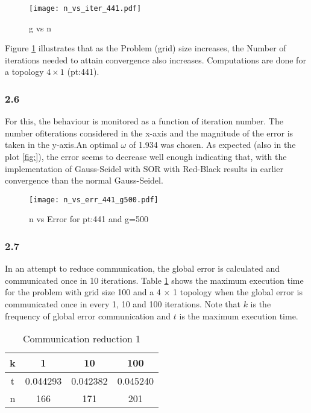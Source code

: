 \begin{figure}[ht]
  \centering
  \texttt{[image: n\_vs\_iter\_441.pdf]}
  \caption{\label{fig:n_vs_iter}  g vs n}
\end{figure}

Figure \ref{fig:n_vs_iter} illustrates that as the Problem (grid) size increases, the Number of iterations needed to attain convergence also increases. Computations are done for a topology $4 \times 1$ (pt:441).


\subsubsection*{2.6}
For this, the behaviour is monitored as a function of iteration number. The number ofiterations considered in the x-axis and the magnitude of the error is taken in the y-axis.An optimal $\omega$ of 1.934 was chosen. As expected (also in the plot \ref{fig:}), the error seems to decrease well enough indicating that, with the implementation of Gauss-Seidel with SOR with Red-Black results in earlier convergence than the normal Gauss-Seidel.
\begin{figure}[h]
  \centering
  \texttt{[image: n\_vs\_err\_441\_g500.pdf]}
  \caption{\label{fig:n_vs_err}  n vs Error for pt:441 and g=500}
\end{figure}
\subsubsection*{2.7}
In an attempt to reduce communication, the global error is calculated and communicated once in 10 iterations. Table \ref{comm1} shows the maximum execution time for the problem with grid size 100 and a 4 $ \times $ 1 topology when the global error is communicated once in every 1, 10 and 100 iterations. Note that $ k $  is the frequency of global error communication and $ t $ is the maximum execution time. \\
	
\begin{table}[h!]
  \centering
  \begin{tabular}{|c|c c c|}
    \hline
    k & 1 		 	& 10 		& 100  \\
    \hline
    t & 0.044293 	& 0.042382  & 0.045240 \\	
    n & 166			& 171	    & 201 \\
    \hline	
  \end{tabular}
  \caption{Communication reduction 1}
  \label{comm1}
\end{table}

